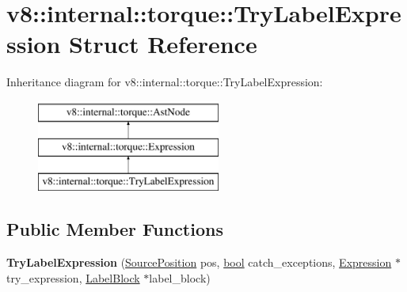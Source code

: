 \hypertarget{structv8_1_1internal_1_1torque_1_1TryLabelExpression}{}\section{v8\+:\+:internal\+:\+:torque\+:\+:Try\+Label\+Expression Struct Reference}
\label{structv8_1_1internal_1_1torque_1_1TryLabelExpression}
Inheritance diagram for v8\+:\+:internal\+:\+:torque\+:\+:Try\+Label\+Expression\+:\begin{figure}[H]
\begin{center}
\leavevmode
\includegraphics[height=3.000000cm]{structv8_1_1internal_1_1torque_1_1TryLabelExpression}
\end{center}
\end{figure}
\subsection*{Public Member Functions}
\begin{DoxyCompactItemize}
\item 
\mbox{\label{structv8_1_1internal_1_1torque_1_1TryLabelExpression_a0eec1bdc62140cfc2625778c2f55eb6a}} 
{\bfseries Try\+Label\+Expression} (\mbox{\hyperlink{structv8_1_1internal_1_1torque_1_1SourcePosition}{Source\+Position}} pos, \mbox{\hyperlink{classbool}{bool}} catch\+\_\+exceptions, \mbox{\hyperlink{structv8_1_1internal_1_1torque_1_1Expression}{Expression}} $\ast$try\+\_\+expression, \mbox{\hyperlink{structv8_1_1internal_1_1torque_1_1LabelBlock}{Label\+Block}} $\ast$label\+\_\+block)
\end{DoxyCompactItemize}
